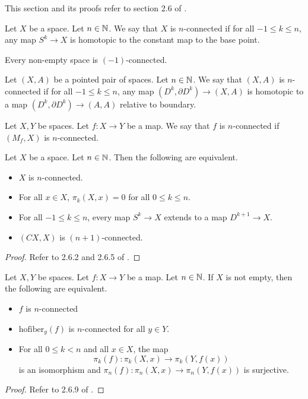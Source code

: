 This section and its proofs refer to section 2.6 of \cite{CHT}. 

\begin{defn}{}{} Let $X$ be a space. Let $n\in\mathbb{N}$. We say that $X$ is $n$-connected if for all $-1\leq k\leq n$, any map $S^k\to X$ is homotopic to the constant map to the base point. 
\end{defn}

Every non-empty space is $(-1)$-connected. 

\begin{defn}{}{} Let $(X,A)$ be a pointed pair of spaces. Let $n\in\mathbb{N}$. We say that $(X,A)$ is $n$-connected if for all $-1\leq k\leq n$, any map $(D^k,\partial D^k)\to(X,A)$ is homotopic to a map $(D^k,\partial D^k)\to (A,A)$ relative to boundary. 
\end{defn}

\begin{defn}{}{} Let $X,Y$ be spaces. Let $f:X\to Y$ be a map. We say that $f$ is $n$-connected if $(M_f,X)$ is $n$-connected. 
\end{defn}

\begin{prp}{}{} Let $X$ be a space. Let $n\in\mathbb{N}$. Then the following are equivalent. 
\begin{itemize}
\item $X$ is $n$-connected. 
\item For all $x\in X$, $\pi_k(X,x)=0$ for all $0\leq k\leq n$. 
\item For all $-1\leq k\leq n$, every map $S^k\to X$ extends to a map $D^{k+1}\to X$. 
\item $(CX,X)$ is $(n+1)$-connected. 
\end{itemize}
\begin{proof}
Refer to 2.6.2 and 2.6.5 of \cite{CHT}. 
\end{proof}
\end{prp}

\begin{prp}\label{prp:MapConnectCon} Let $X,Y$ be spaces. Let $f:X\to Y$ be a map. Let $n\in\mathbb{N}$. If $X$ is not empty, then the following are equivalent. 
\begin{itemize}
\item $f$ is $n$-connected
\item $\text{hofiber}_y(f)$ is $n$-connected for all $y\in Y$. 
\item For all $0\leq k<n$ and all $x\in X$, the map $$\pi_k(f):\pi_k(X,x)\to\pi_k(Y,f(x))$$ is an isomorphism and $\pi_n(f):\pi_n(X,x)\to\pi_n(Y,f(x))$ is surjective. 
\end{itemize}
\begin{proof}
Refer to 2.6.9 of \cite{CHT}. 
\end{proof}
\end{prp}

